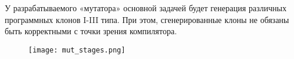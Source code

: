 У разрабатываемого «мутатора» основной задачей будет генерация различных программных клонов I-III типа. При этом, сгенерированные клоны не обязаны быть корректными с точки зрения компилятора.


\begin{figure}[htbp]
\centering
\texttt{[image: mut\_stages.png]}
\caption{}
\label{fig:mut_stages}
\end{figure}
